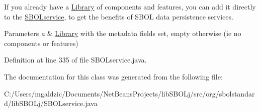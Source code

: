 If you already have a \hyperlink{classorg_1_1sbolstandard_1_1lib_s_b_o_lj_1_1_library}{Library} of components and features, you can add it directly to the \hyperlink{classorg_1_1sbolstandard_1_1lib_s_b_o_lj_1_1_s_b_o_lservice}{SBOLservice}, to get the benefits of SBOL data persistence services.


\begin{DoxyParams}{Parameters}
{\em a} & \hyperlink{classorg_1_1sbolstandard_1_1lib_s_b_o_lj_1_1_library}{Library} with the metadata fields set, empty otherwise (ie no components or features) \\
\hline
\end{DoxyParams}


Definition at line 335 of file SBOLservice.java.



The documentation for this class was generated from the following file:\begin{DoxyCompactItemize}
\item 
C:/Users/mgaldzic/Documents/NetBeansProjects/libSBOLj/src/org/sbolstandard/libSBOLj/SBOLservice.java\end{DoxyCompactItemize}
